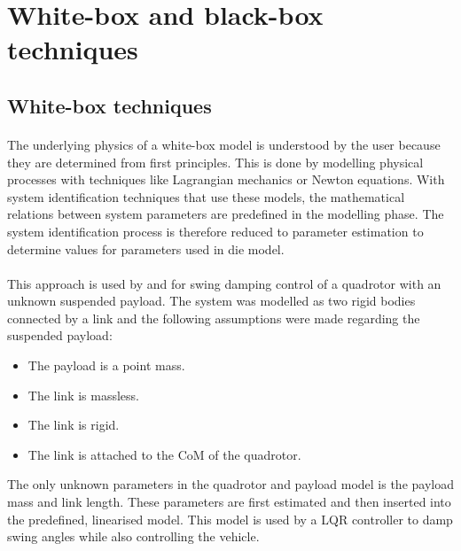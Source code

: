 \section{White-box and black-box techniques}

    \subsection{White-box techniques}

        \paragraph{} 
        The underlying physics of a white-box model is understood by the user because    
        they are determined from first principles.
        This is done by modelling physical processes with techniques like Lagrangian mechanics or Newton equations.
        With system identification techniques that use these models, 
        the mathematical relations between system parameters are predefined in the modelling phase.
        The system identification process is therefore reduced to parameter estimation to determine values for parameters used in die model.

        \paragraph{} 
        This approach is used by \cite{Erasmus2020} and \cite{Slabber2020} for swing damping control of a quadrotor with an unknown suspended payload.
        The system was modelled as two rigid bodies connected by a link and the following assumptions were made regarding the suspended payload:
        \begin{itemize}
            \item The payload is a point mass.
            \item The link is massless.
            \item The link is rigid.
            \item The link is attached to the CoM of the quadrotor.
        \end{itemize}
        The only unknown parameters in the quadrotor and payload model is the payload mass and link length.
        These parameters are first estimated and then inserted into the predefined, linearised model.
        This model is used by a LQR controller to damp swing angles while also controlling the vehicle.

